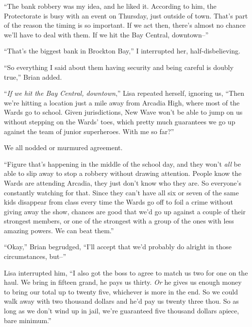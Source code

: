 ``The bank robbery was my idea, and he liked it.  According to him, the Protectorate is busy with an event on Thursday, just outside of town.  That's part of the reason the timing is so important.  If we act then, there's almost no chance we'll have to deal with them.  If we hit the Bay Central, downtown--''



``That's the biggest bank in Brockton Bay,'' I interrupted her, half-disbelieving.



``So everything I said about them having security and being careful is doubly true,'' Brian added.



``\emph{If we hit the Bay Central, downtown},'' Lisa repeated herself, ignoring us, ``Then we're hitting a location just a mile away from Arcadia High, where most of the Wards go to school.  Given jurisdictions, New Wave won't be able to jump on us without stepping on the Wards' toes, which pretty much guarantees we go up against the team of junior superheroes.  With me so far?''



We all nodded or murmured agreement.



``Figure that's happening in the middle of the school day, and they won't \emph{all} be able to slip away to stop a robbery without drawing attention.  People know the Wards are attending Arcadia, they just don't know who they are.  So everyone's constantly watching for that.  Since they can't have all six or seven of the same kids disappear from class every time the Wards go off to foil a crime without giving away the show, chances are good that we'd go up against a couple of their strongest members, or one of the strongest with a group of the ones with less amazing powers.  We can beat them.''



``Okay,'' Brian begrudged, ``I'll accept that we'd probably do alright in those circumstances, but--''



Lisa interrupted him, ``I also got the boss to agree to match us two for one on the haul.  We bring in fifteen grand, he pays us thirty.  \emph{Or} he gives us enough money to bring our total up to twenty five, whichever is more in the end.  So we could walk away with two thousand dollars and he'd pay us twenty three thou.  So as long as we don't wind up in jail, we're guaranteed five thousand dollars apiece, bare minimum.''




